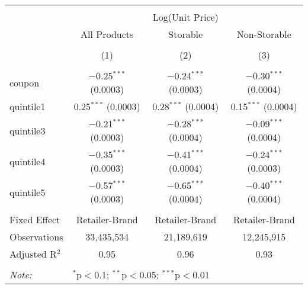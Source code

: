 
\begin{table}[!htbp] \centering 
  \caption{} 
  \label{tab:overallSavings} 
\begin{tabular}{@{\extracolsep{5pt}}lccc} 
\\[-1.8ex]\hline 
\hline \\[-1.8ex] 
 & \multicolumn{3}{c}{Log(Unit Price)} \\ 
\cline{2-4} 
 & All Products & Storable & Non-Storable \\ 
\\[-1.8ex] & (1) & (2) & (3)\\ 
\hline \\[-1.8ex] 
 coupon & $-$0.25$^{***}$ (0.0003) & $-$0.24$^{***}$ (0.0003) & $-$0.30$^{***}$ (0.0004) \\ 
  quintile1 & 0.25$^{***}$ (0.0003) & 0.28$^{***}$ (0.0004) & 0.15$^{***}$ (0.0004) \\ 
  quintile3 & $-$0.21$^{***}$ (0.0003) & $-$0.28$^{***}$ (0.0004) & $-$0.09$^{***}$ (0.0004) \\ 
  quintile4 & $-$0.35$^{***}$ (0.0003) & $-$0.41$^{***}$ (0.0004) & $-$0.24$^{***}$ (0.0003) \\ 
  quintile5 & $-$0.57$^{***}$ (0.0003) & $-$0.65$^{***}$ (0.0004) & $-$0.40$^{***}$ (0.0004) \\ 
 \hline \\[-1.8ex] 
Fixed Effect & Retailer-Brand & Retailer-Brand & Retailer-Brand \\ 
Observations & 33,435,534 & 21,189,619 & 12,245,915 \\ 
Adjusted R$^{2}$ & 0.95 & 0.96 & 0.93 \\ 
\hline 
\hline \\[-1.8ex] 
\textit{Note:}  & \multicolumn{3}{l}{$^{*}$p$<$0.1; $^{**}$p$<$0.05; $^{***}$p$<$0.01} \\ 
\end{tabular} 
\end{table} 
